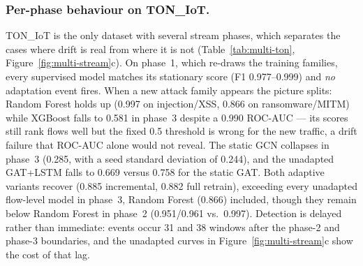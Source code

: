 \documentclass[twocolumn]{llncs}
\begin{document}
\subsubsection{Per-phase behaviour on TON\_IoT.} TON\_IoT is the only dataset with several stream
phases, which separates the cases where drift is real from where it is not
(Table~\ref{tab:multi-ton}, Figure~\ref{fig:multi-stream}c). On phase~1, which re-draws the
training families, every supervised model matches its stationary score (F1 0.977--0.999) and
\emph{no} adaptation event fires. When a new attack family appears the picture splits: Random Forest
holds up (0.997 on injection/XSS, 0.866 on ransomware/MITM) while XGBoost falls to 0.581 in phase~3
despite a 0.990 ROC-AUC --- its scores still rank flows well but the fixed 0.5 threshold is wrong
for the new traffic, a drift failure that ROC-AUC alone would not reveal. The static GCN collapses
in phase~3 (0.285, with a seed standard deviation of 0.244), and the unadapted GAT+LSTM falls to
0.669 versus 0.758 for the static GAT. Both adaptive variants recover (0.885 incremental, 0.882
full retrain), exceeding every unadapted flow-level model in phase~3, Random Forest (0.866)
included, though they remain below Random Forest in phase~2 (0.951/0.961 vs.\ 0.997). Detection is delayed rather than immediate: events occur 31 and 38 windows after the
phase-2 and phase-3 boundaries, and the unadapted curves in Figure~\ref{fig:multi-stream}c show
the cost of that lag.
\end{document}
